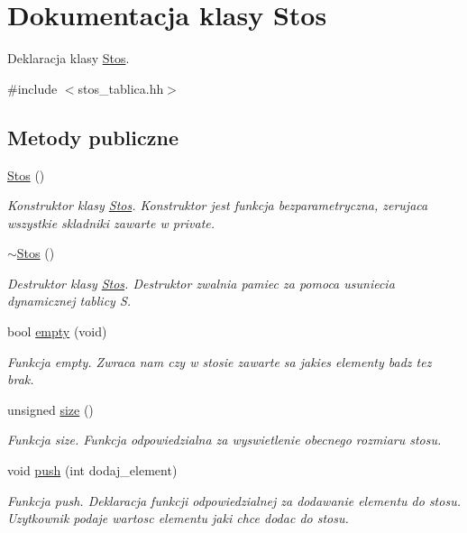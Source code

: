 \hypertarget{class_stos}{\section{\-Dokumentacja klasy \-Stos}
\label{class_stos}
}


\-Deklaracja klasy \hyperlink{class_stos}{\-Stos}.  




{\ttfamily \#include $<$stos\-\_\-tablica.\-hh$>$}

\subsection*{\-Metody publiczne}
\begin{DoxyCompactItemize}
\item 
\hyperlink{class_stos_a1de3b50386d5dfb56ddece17d0ea2389}{\-Stos} ()
\begin{DoxyCompactList}\small\item\em \-Konstruktor klasy \hyperlink{class_stos}{\-Stos}. \-Konstruktor jest funkcja bezparametryczna, zerujaca wszystkie skladniki zawarte w private. \end{DoxyCompactList}\item 
\hyperlink{class_stos_af9a198e2540e18adcc0b5259105fd78e}{$\sim$\-Stos} ()
\begin{DoxyCompactList}\small\item\em \-Destruktor klasy \hyperlink{class_stos}{\-Stos}. \-Destruktor zwalnia pamiec za pomoca usuniecia dynamicznej tablicy \-S. \end{DoxyCompactList}\item 
bool \hyperlink{class_stos_a2d6a33b87b09dd8c5e61dbeb1df59ec8}{empty} (void)
\begin{DoxyCompactList}\small\item\em \-Funkcja empty. \-Zwraca nam czy w stosie zawarte sa jakies elementy badz tez brak. \end{DoxyCompactList}\item 
unsigned \hyperlink{class_stos_a7658744ffd2f5792145d6ee5bfb8f8f8}{size} ()
\begin{DoxyCompactList}\small\item\em \-Funkcja size. \-Funkcja odpowiedzialna za wyswietlenie obecnego rozmiaru stosu. \end{DoxyCompactList}\item 
void \hyperlink{class_stos_a609341925384a8d758c01d4b1b2e9bca}{push} (int dodaj\-\_\-element)
\begin{DoxyCompactList}\small\item\em \-Funkcja push. \-Deklaracja funkcji odpowiedzialnej za dodawanie elementu do stosu. \-Uzytkownik podaje wartosc elementu jaki chce dodac do stosu. \end{DoxyCompactList}\item 

\end{DoxyCompactItemize}
